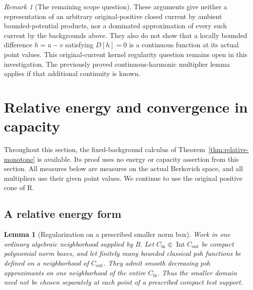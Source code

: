 \documentclass[11pt,a4paper]{article}
\numberwithin{equation}{section}
\newtheorem{lemma}[theorem]{Lemma}
\theoremstyle{definition}
\theoremstyle{remark}
\newtheorem{remark}[theorem]{Remark}
\begin{document}
\begin{remark}[The remaining scope question]
These arguments give neither a representation of an arbitrary
original-positive closed current by ambient bounded-potential products,
nor a dominated approximation of every such current by the backgrounds
above. They also do not show that a locally bounded difference
$h=u-v$ satisfying $D[h]=0$ is a continuous function at its actual
point values. This original-current kernel regularity question remains
open in this investigation. The previously proved continuous-harmonic
multiplier lemma applies if that additional continuity is known.
\end{remark}




\section{Relative energy and convergence in capacity}
\label{sec:relative-energy-capacity}

Throughout this section, the fixed-background calculus of
Theorem~\ref{thm:relative-monotone} is available. Its proof uses no energy
or capacity assertion from this section. All measures below are measures
on the actual Berkovich space, and all multipliers use their given point
values. We continue to use the original positive cone of \textup{R}.

\subsection{A relative energy form}

\begin{lemma}[Regularization on a prescribed smaller norm box]
\label{lem:compact-box-regularization}
Work in one ordinary algebraic neighborhood supplied by \textup{B}.
Let $C_{\mathrm{in}}\Subset\operatorname{Int}C_{\mathrm{out}}$ be
compact polynomial norm boxes, and let finitely many bounded classical
psh functions be defined on a neighborhood of $C_{\mathrm{out}}$.
They admit smooth decreasing psh approximants on one neighborhood of
the entire $C_{\mathrm{in}}$. Thus the smaller domain need not be
chosen separately at each point of a prescribed compact test support.
\end{lemma}
\end{document}
